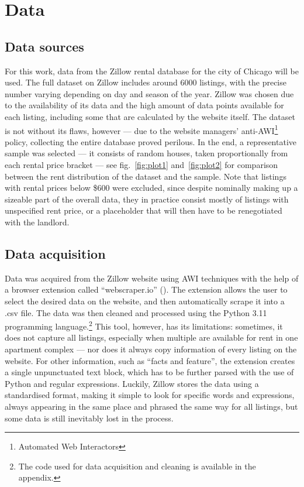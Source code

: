 \documentclass[12pt]{report}
\begin{document}
\section{Data}

\subsection{Data sources}

For this work, data from the Zillow rental database for the city of Chicago will be used. The full dataset on Zillow includes around 6000 listings, with the precise number varying depending on day and season of the year. Zillow was chosen due to the availability of its data and the high amount of data points available for each listing, including some that are calculated by the website itself. The dataset is not without its flaws, however --- due to the website managers' anti-AWI\footnote{Automated Web Interactors} policy, collecting the entire database proved perilous. In the end, a representative sample was selected --- it consists of random houses, taken proportionally from each rental price bracket --- see fig.\ \ref{fig:plot1} and~\ref{fig:plot2} for comparison between the rent distribution of the dataset and the sample. Note that listings with rental prices below \$600 were excluded, since despite nominally making up a sizeable part of the overall data, they in practice consist mostly of listings with unspecified rent price, or a placeholder that will then have to be renegotiated with the landlord.

\subsection{Data acquisition}
Data was acquired from the Zillow website using AWI techniques with the help of a browser extension called ``webscraper.io'' (\cite{webscraper}). The extension allows the user to select the desired data on the website, and then automatically scrape it into a .csv file. The data was then cleaned and processed using the Python 3.11 programming language.\footnote{The code used for data acquisition and cleaning is available in the appendix.} This tool, however, has its limitations: sometimes, it does not capture all listings, especially when multiple are available for rent in one apartment complex --- nor does it always copy information of every listing on the website. For other information, such as ``facts and feature'', the extension creates a single unpunctuated text block, which has to be further parsed with the use of Python and regular expressions. Luckily, Zillow stores the data using a standardised format, making it simple to look for specific words and expressions, always appearing in the same place and phrased the same way for all listings, but some data is still inevitably lost in the process.
\end{document}

